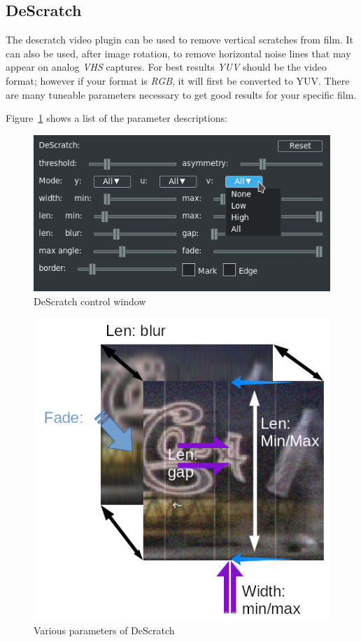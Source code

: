 \subsection{DeScratch}%
\label{sub:descratch}

The descratch video plugin can be used to remove vertical scratches from film. It can also be used, after image rotation, to remove horizontal noise lines that may appear on analog \textit{VHS} captures. For best results \textit{YUV} should be the video format; however if your format is \textit{RGB}, it will first be converted to YUV. There are many tuneable parameters necessary to get good results for your specific film.

Figure~\ref{fig:descratch01} shows a list of the parameter descriptions:

\begin{figure}[htpb]
    \centering
    \includegraphics[width=0.6\linewidth]{images/descratch01.png}
    \caption{DeScratch control window}
    \label{fig:descratch01}
\end{figure}

\begin{figure}[htpb]
    \centering
    \includegraphics[width=0.8\linewidth]{images/descratch02.png}
    \caption{Various parameters of DeScratch}
    \label{fig:descratch02}
\end{figure}

